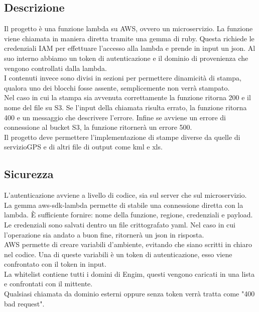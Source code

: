 \documentclass[12pt]{article}
\begin{document}
\subsection{Descrizione}
Il progetto è una funzione lambda su AWS, ovvero un microservizio. La funzione 
viene chiamata in maniera diretta tramite una gemma di ruby.
Questa richiede le credenziali IAM per effettuare l'accesso alla lambda e prende 
in input un json. Al suo interno abbiamo un token di autenticazione e il dominio 
di provenienza che vengono controllati dalla lambda. 
\\ I contenuti invece sono divisi in sezioni per permettere dinamicità di stampa, 
qualora uno dei blocchi fosse assente, semplicemente non verrà stampato. 
\\ Nel caso in cui la stampa sia avvenuta correttamente la funzione ritorna 200 
e il nome del file su S3. Se l'input della chiamata risulta errato, la funzione ritorna 
400 e un messaggio che descrivere l'errore. Infine se avviene un errore di connessione 
al bucket S3, la funzione ritornerà un errore 500.    
\\ Il progetto deve permettere l'implementazione di stampe diverse da quelle di servizioGPS
e di altri file di output come kml e xls. 



\subsection{Sicurezza}
L'autenticazione avviene a livello di codice, sia sul server che sul microservizio.
\\ La gemma aws-sdk-lambda permette di stabile una connessione diretta con la 
lambda. È sufficiente fornire: nome della funzione, regione, credenziali e payload. 
Le credenziali sono salvati dentro un file crittografato yaml. Nel caso in cui 
l'operazione sia andato a buon fine, ritornerà un json in risposta.
\\ AWS permette di creare variabili
d'ambiente, evitando che siano scritti in chiaro nel codice. Una di queste variabili 
è un token di autenticazione, esso viene confrontato con il token in input. 
\\ La whitelist contiene tutti i domini di Engim, questi vengono caricati in 
una lista e confrontati con il mittente. 
\\ Qualsiasi chiamata da dominio esterni oppure senza token verrà tratta come 
"400 bad request". 
\end{document}
